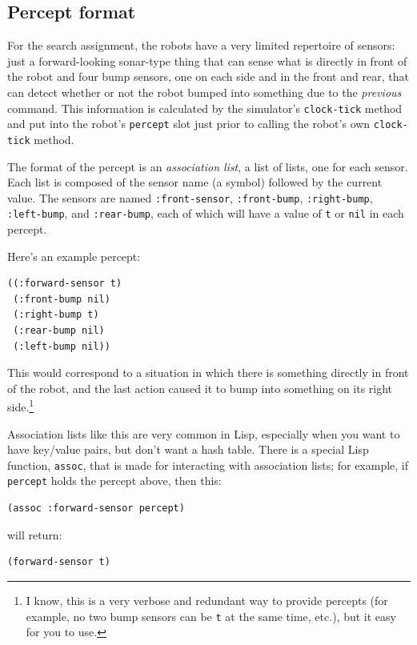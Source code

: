 \documentclass[11pt]{tufte-handout}
\begin{document}
\subsection{Percept format}
\label{sec:org5567ff9}

For the search assignment, the robots have a very  limited repertoire of sensors: just a forward-looking sonar-type thing that can  sense what is directly in front of the robot and four bump sensors, one on each side and in the front and rear, that can detect whether or not the robot bumped into something due to the \emph{previous} command.  This information is calculated by the simulator's \texttt{clock-tick} method and put into the robot's \texttt{percept} slot just prior to calling the robot's own \texttt{clock-tick} method.

\label{org4949049}

The format of the percept is an \emph{association list}, a list of lists, one for each sensor.  Each list is composed of the sensor name (a symbol) followed by the current value.  The sensors are named \texttt{:front-sensor}, \texttt{:front-bump}, \texttt{:right-bump}, \texttt{:left-bump}, and \texttt{:rear-bump}, each of which will have a value of  \texttt{t} or \texttt{nil} in each percept.  

Here's an example percept:
\begin{verbatim}
((:forward-sensor t)
 (:front-bump nil)
 (:right-bump t)
 (:rear-bump nil)
 (:left-bump nil))
\end{verbatim}

\noindent This would correspond to a situation in which there is something directly in front of the robot, and the last action caused it to bump into something on its right side.\footnote{I know, this is a very verbose and redundant way to provide percepts (for example, no two bump sensors can be \texttt{t} at the same time, etc.), but it easy for you to use.}

Association lists like this are very common in Lisp, especially when you want to have key/value pairs, but don't want a hash table.  There is a special Lisp function, \texttt{assoc}, that is made for interacting with association lists; for example, if \texttt{percept} holds the percept above, then this:
\begin{verbatim}
(assoc :forward-sensor percept)
\end{verbatim}

\noindent will return:
\begin{verbatim}
(forward-sensor t)
\end{verbatim}
\end{document}
